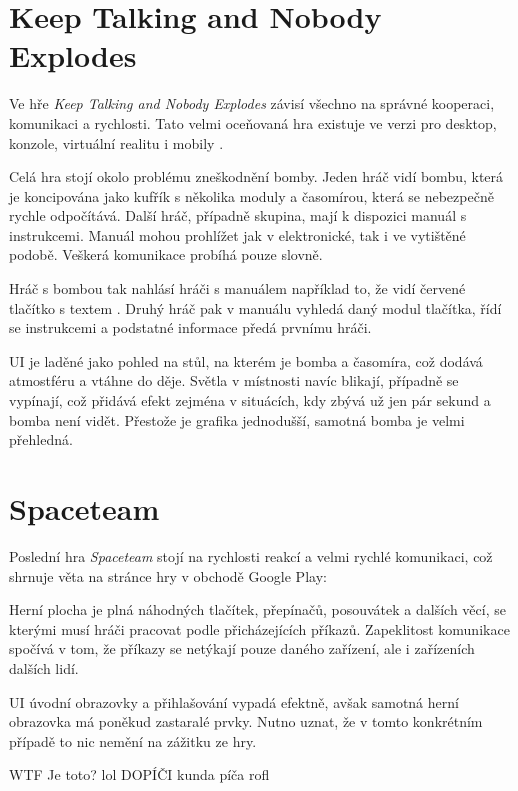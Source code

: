 \section{Keep Talking and Nobody Explodes}

Ve hře \emph{Keep Talking and Nobody Explodes} závisí všechno na správné kooperaci, komunikaci a rychlosti. Tato velmi oceňovaná hra existuje ve verzi pro desktop, konzole, virtuální realitu i mobily \cite{steelcrategamesinc_keep}.

Celá hra stojí okolo problému zneškodnění bomby. Jeden hráč vidí bombu, která je koncipována jako kufřík s několika moduly a časomírou, která se nebezpečně rychle odpočítává. Další hráč, případně skupina, mají k dispozici manuál s instrukcemi. Manuál mohou prohlížet jak v elektronické, tak i ve vytištěné podobě. Veškerá komunikace probíhá pouze slovně.

Hráč s bombou tak nahlásí hráči s manuálem například to, že vidí červené tlačítko s textem . Druhý hráč pak v manuálu vyhledá daný modul tlačítka, řídí se instrukcemi a podstatné informace předá prvnímu hráči.

UI je laděné jako pohled na stůl, na kterém je bomba a časomíra, což dodává atmostféru a vtáhne do děje. Světla v místnosti navíc blikají, případně se vypínají, což přidává efekt zejména v situácích, kdy zbývá už jen pár sekund a bomba není vidět. Přestože je grafika jednodušší, samotná bomba je velmi přehledná.

\section{Spaceteam}

Poslední hra \emph{Spaceteam} stojí na rychlosti reakcí a velmi rychlé komunikaci, což shrnuje věta na stránce hry \cite{henrysmithinc_spaceteam} v obchodě Google Play: 

Herní plocha je plná náhodných tlačítek, přepínačů, posouvátek a dalších věcí, se kterými musí hráči pracovat podle přicházejících  příkazů. Zapeklitost komunikace spočívá v tom, že příkazy se netýkají pouze daného zařízení, ale i zařízeních dalších lidí.

UI úvodní obrazovky a přihlašování vypadá efektně, avšak samotná herní obrazovka má poněkud zastaralé prvky. Nutno uznat, že v tomto konkrétním případě to nic nemění na zážitku ze hry.

WTF Je toto? lol DOPÍČI kunda píča rofl
